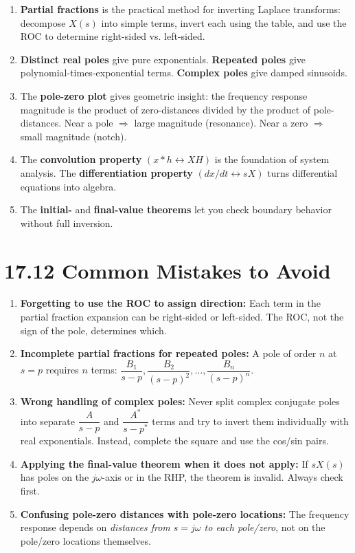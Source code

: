 \documentclass[11pt]{article}
\begin{document}
\begin{enumerate}
  \item \textbf{Partial fractions} is the practical method for inverting Laplace transforms: decompose $X(s)$ into simple terms, invert each using the table, and use the ROC to determine right-sided vs. left-sided.
  \item \textbf{Distinct real poles} give pure exponentials. \textbf{Repeated poles} give polynomial-times-exponential terms. \textbf{Complex poles} give damped sinusoids.
  \item The \textbf{pole-zero plot} gives geometric insight: the frequency response magnitude is the product of zero-distances divided by the product of pole-distances. Near a pole $\Rightarrow$ large magnitude (resonance). Near a zero $\Rightarrow$ small magnitude (notch).
  \item The \textbf{convolution property} $(x * h \leftrightarrow XH)$ is the foundation of system analysis. The \textbf{differentiation property} $(dx/dt \leftrightarrow sX)$ turns differential equations into algebra.
  \item The \textbf{initial-} and \textbf{final-value theorems} let you check boundary behavior without full inversion.
\end{enumerate}

\section*{17.12 Common Mistakes to Avoid}

\begin{enumerate}
  \item \textbf{Forgetting to use the ROC to assign direction:} Each term in the partial fraction expansion can be right-sided or left-sided. The ROC, not the sign of the pole, determines which.
  \item \textbf{Incomplete partial fractions for repeated poles:} A pole of order $n$ at $s = p$ requires $n$ terms: $\dfrac{B_1}{s-p}, \dfrac{B_2}{(s-p)^2}, \ldots, \dfrac{B_n}{(s-p)^n}$.
  \item \textbf{Wrong handling of complex poles:} Never split complex conjugate poles into separate $\dfrac{A}{s-p}$ and $\dfrac{A^*}{s-p^*}$ terms and try to invert them individually with real exponentials. Instead, complete the square and use the cos/sin pairs.
  \item \textbf{Applying the final-value theorem when it does not apply:} If $sX(s)$ has poles on the $j\omega$-axis or in the RHP, the theorem is invalid. Always check first.
  \item \textbf{Confusing pole-zero distances with pole-zero locations:} The frequency response depends on \textit{distances from $s = j\omega$ to each pole/zero}, not on the pole/zero locations themselves.
\end{enumerate}
\end{document}

